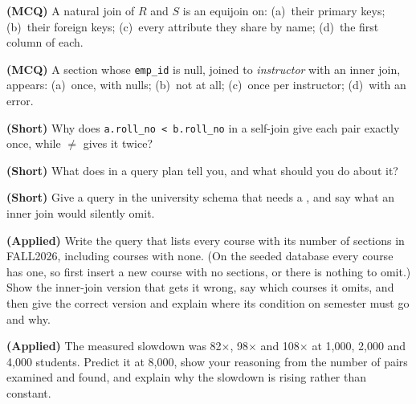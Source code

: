 \begin{reviewq}
  \item \textbf{(MCQ)} A natural join of $R$ and $S$ is an equijoin on:
        (a)~their primary keys; (b)~their foreign keys; (c)~every attribute
        they share by name; (d)~the first column of each.
  \item \textbf{(MCQ)} A section whose \texttt{emp\_id} is null, joined to
        \textit{instructor} with an inner join, appears: (a)~once, with nulls;
        (b)~not at all; (c)~once per instructor; (d)~with an error.
  \item \textbf{(Short)} Why does \texttt{a.roll\_no < b.roll\_no} in a
        self-join give each pair exactly once, while $\neq$ gives it twice?
  \item \textbf{(Short)} What does  in a query
        plan tell you, and what should you do about it?
  \item \textbf{(Short)} Give a query in the university schema that needs a
        , and say what an inner join would silently omit.
  \item \textbf{(Applied)} Write the query that lists every course with its
        number of sections in FALL2026, including courses with none. (On the
        seeded database every course has one, so first insert a new course
        with no sections, or there is nothing to omit.) Show the inner-join
        version that gets it wrong, say which courses it omits, and then give
        the correct version and explain where its condition on semester must
        go and why.
  \item \textbf{(Applied)} The measured slowdown was 82$\times$, 98$\times$ and
        108$\times$ at 1{,}000, 2{,}000 and 4{,}000 students. Predict it at
        8{,}000, show your reasoning from the number of pairs examined and
        found, and explain why the slowdown is rising rather than constant.
\end{reviewq}
